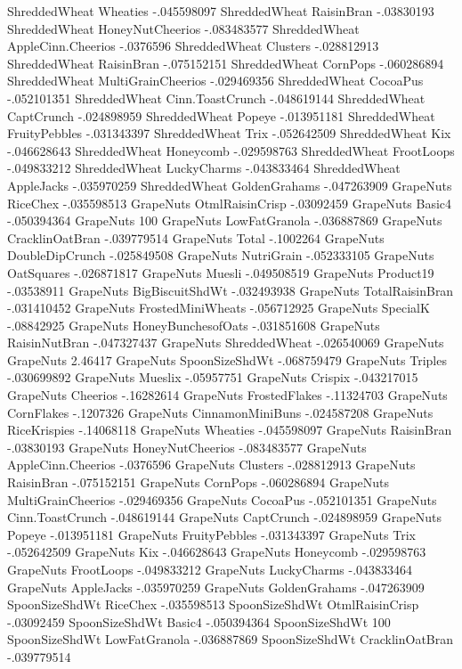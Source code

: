ShreddedWheat	Wheaties	-.045598097
ShreddedWheat	RaisinBran	-.03830193
ShreddedWheat	HoneyNutCheerios	-.083483577
ShreddedWheat	AppleCinn.Cheerios	-.0376596
ShreddedWheat	Clusters	-.028812913
ShreddedWheat	RaisinBran	-.075152151
ShreddedWheat	CornPops	-.060286894
ShreddedWheat	MultiGrainCheerios	-.029469356
ShreddedWheat	CocoaPus	-.052101351
ShreddedWheat	Cinn.ToastCrunch	-.048619144
ShreddedWheat	CaptCrunch	-.024898959
ShreddedWheat	Popeye	-.013951181
ShreddedWheat	FruityPebbles	-.031343397
ShreddedWheat	Trix	-.052642509
ShreddedWheat	Kix	-.046628643
ShreddedWheat	Honeycomb	-.029598763
ShreddedWheat	FrootLoops	-.049833212
ShreddedWheat	LuckyCharms	-.043833464
ShreddedWheat	AppleJacks	-.035970259
ShreddedWheat	GoldenGrahams	-.047263909
GrapeNuts	RiceChex	-.035598513
GrapeNuts	OtmlRaisinCrisp	-.03092459
GrapeNuts	Basic4	-.050394364
GrapeNuts	100%
GrapeNuts	LowFatGranola	-.036887869
GrapeNuts	CracklinOatBran	-.039779514
GrapeNuts	Total	-.1002264
GrapeNuts	DoubleDipCrunch	-.025849508
GrapeNuts	NutriGrain	-.052333105
GrapeNuts	OatSquares	-.026871817
GrapeNuts	Muesli	-.049508519
GrapeNuts	Product19	-.03538911
GrapeNuts	BigBiscuitShdWt	-.032493938
GrapeNuts	TotalRaisinBran	-.031410452
GrapeNuts	FrostedMiniWheats	-.056712925
GrapeNuts	SpecialK	-.08842925
GrapeNuts	HoneyBunchesofOats	-.031851608
GrapeNuts	RaisinNutBran	-.047327437
GrapeNuts	ShreddedWheat	-.026540069
GrapeNuts	GrapeNuts	2.46417
GrapeNuts	SpoonSizeShdWt	-.068759479
GrapeNuts	Triples	-.030699892
GrapeNuts	Mueslix	-.05957751
GrapeNuts	Crispix	-.043217015
GrapeNuts	Cheerios	-.16282614
GrapeNuts	FrostedFlakes	-.11324703
GrapeNuts	CornFlakes	-.1207326
GrapeNuts	CinnamonMiniBuns	-.024587208
GrapeNuts	RiceKrispies	-.14068118
GrapeNuts	Wheaties	-.045598097
GrapeNuts	RaisinBran	-.03830193
GrapeNuts	HoneyNutCheerios	-.083483577
GrapeNuts	AppleCinn.Cheerios	-.0376596
GrapeNuts	Clusters	-.028812913
GrapeNuts	RaisinBran	-.075152151
GrapeNuts	CornPops	-.060286894
GrapeNuts	MultiGrainCheerios	-.029469356
GrapeNuts	CocoaPus	-.052101351
GrapeNuts	Cinn.ToastCrunch	-.048619144
GrapeNuts	CaptCrunch	-.024898959
GrapeNuts	Popeye	-.013951181
GrapeNuts	FruityPebbles	-.031343397
GrapeNuts	Trix	-.052642509
GrapeNuts	Kix	-.046628643
GrapeNuts	Honeycomb	-.029598763
GrapeNuts	FrootLoops	-.049833212
GrapeNuts	LuckyCharms	-.043833464
GrapeNuts	AppleJacks	-.035970259
GrapeNuts	GoldenGrahams	-.047263909
SpoonSizeShdWt	RiceChex	-.035598513
SpoonSizeShdWt	OtmlRaisinCrisp	-.03092459
SpoonSizeShdWt	Basic4	-.050394364
SpoonSizeShdWt	100%
SpoonSizeShdWt	LowFatGranola	-.036887869
SpoonSizeShdWt	CracklinOatBran	-.039779514
